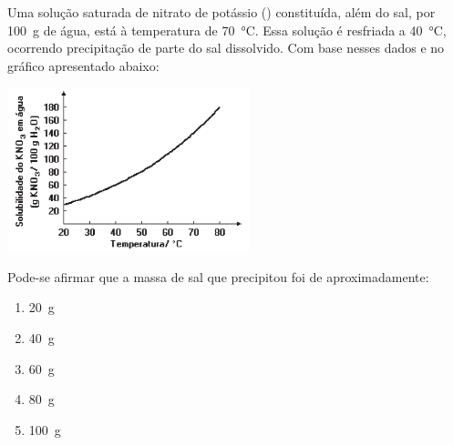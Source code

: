 Uma solução saturada de nitrato de potássio () constituída, além do sal, por \SI{100}{\gram} de água, está à temperatura de \SI{70}{\celsius}.
Essa solução é resfriada a \SI{40}{\celsius}, ocorrendo precipitação de parte do sal dissolvido.
Com base nesses dados e no gráfico apresentado abaixo:

\begin{center}
	\includegraphics[width = 7cm]{figure.png}
\end{center}

Pode-se afirmar que a massa de sal que precipitou foi de aproximadamente:

\begin{enumerate}[label = (\scalealph{\alph*})]
	\item \SI{20}{\gram}
	\item \SI{40}{\gram}
	\item \SI{60}{\gram}
	\item \SI{80}{\gram}
	\item \SI{100}{\gram}
\end{enumerate}
